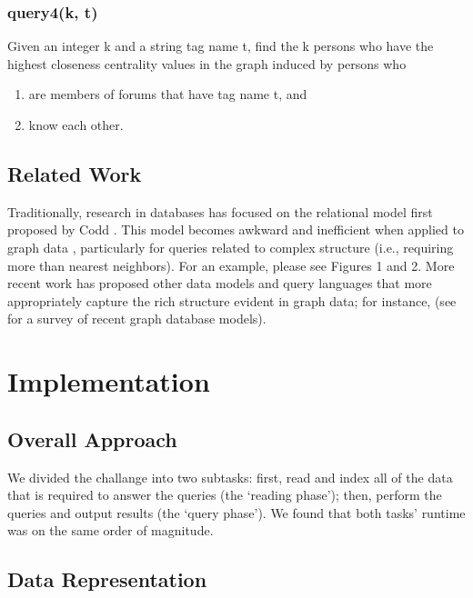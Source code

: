 \documentclass{article}
\begin{document}
\subsubsection{query4(k, t)}
Given an integer k and a string tag name t, find the k persons who
have the highest closeness centrality values in the graph induced by
persons who
\begin{enumerate}
\item are members of forums that have tag name t, and
\item know each other.
\end{enumerate}


\subsection{Related Work}
Traditionally, research in databases has focused on the relational
model first proposed by Codd \cite{codd1970relational}.  This model
becomes awkward and inefficient when applied to graph data
\cite{rodriguez2011graph}, particularly for queries related to
complex structure (i.e., requiring more than nearest neighbors).  For
an example, please see \cite{he2008graphs} Figures 1 and 2.  More
recent work has proposed other data models and query languages that
more appropriately capture the rich structure evident in graph data;
for instance,
\cite{he2008graphs,sun2012efficient,low2010graphlab} (see
\cite{angles2008survey} for a survey of recent graph database
models).  


\section{Implementation}
\subsection{Overall Approach}
We divided the challange into two subtasks: first, read and index all
of the data that is required to answer the queries (the `reading
phase'); then, perform the queries and output results (the `query
phase').  We found that both tasks' runtime was on the same order of
magnitude.  

\subsection{Data Representation}
\end{document}
